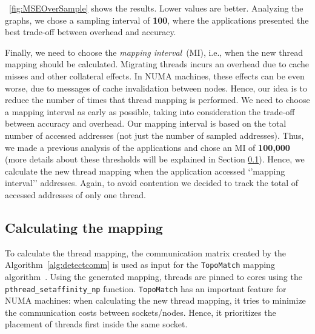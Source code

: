 \figurename~\ref{fig:MSEOverSample} shows the results. Lower values are better. Analyzing the graphs, we chose a sampling interval of \textbf{100}, where the applications presented the best trade-off between overhead and accuracy.

Finally, we need to choose the \emph{mapping interval}~(MI), i.e., when the new thread mapping should be calculated. Migrating threads incurs an overhead due to cache misses and other collateral effects. In NUMA machines, these effects can be even worse, due to messages of cache invalidation between nodes. Hence, our idea is to reduce the number of times that thread mapping is performed. We need to choose a mapping interval as early as possible, taking into consideration the trade-off between accuracy and overhead. Our mapping interval is based on the total number of accessed addresses (not just the number of sampled addresses). Thus, we made a previous analysis of the applications and chose an MI of \textbf{100,000} (more details about these thresholds will be explained in Section \ref{sec:calculatemap}). Hence, we calculate the new thread mapping when the application accessed `'mapping interval'' addresses. Again, to avoid contention we decided to track the total of accessed addresses of only one thread.

\subsection{Calculating the mapping}\label{sec:calculatemap}

To calculate the thread mapping, the communication matrix created by the Algorithm~\ref{alg:detectcomm} is used as input for the \texttt{TopoMatch} mapping algorithm~\cite{TopoMatch}. Using the generated mapping, threads are pinned to cores using the \mbox{\texttt{pthread\_setaffinity\_np}} function. \texttt{TopoMatch} has an important feature
for NUMA machines: when calculating the new thread mapping, it tries to minimize the communication costs between sockets/nodes. Hence, it prioritizes the placement of threads first inside the same socket.

